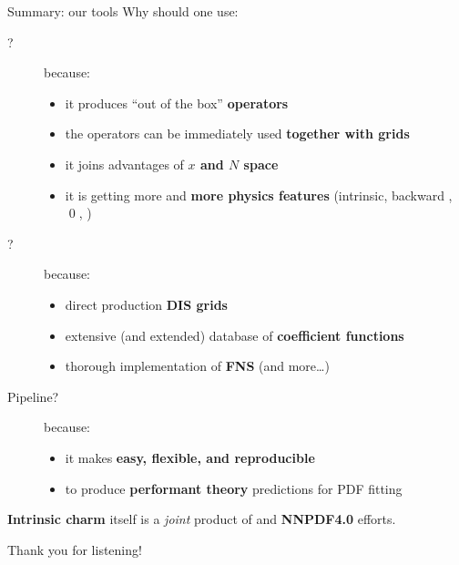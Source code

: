 \documentclass[9pt]{beamer}
\begin{document}
\begin{frame}{Summary: our tools}
    Why should one use:
    \begin{description}
        \item[\eko?] because:
            \begin{itemize}
                \item it produces \enquote{out of the box} \textbf{operators}
                \item the operators can be immediately used \textbf{together with grids}
                \item it joins advantages of \textbf{$x$ and $N$ space}
                \item it is getting more and \textbf{more physics
                    features} (intrinsic, backward \vfns, \qed, \nnnlo)
            \end{itemize}
        \item[\yadism?] because:
            \begin{itemize}
                \item direct production \textbf{DIS grids}
                \item extensive (and extended) database of \textbf{coefficient
                    functions}
                \item thorough implementation of \textbf{FNS} (and more\dots)
            \end{itemize}
        \item[Pipeline?] because:
            \begin{itemize}
                \item it makes \textbf{easy, flexible, and reproducible}
                \item to produce \textbf{performant theory} predictions for PDF fitting
            \end{itemize}
                 \end{description}

    \vspace*{15pt}
    \alert{\textbf{Intrinsic charm}} itself is a \textit{joint} product of \eko
    and \textbf{NNPDF4.0} efforts.
\end{frame}

\begin{frame}[standout]
    Thank you for listening!
\end{frame}

\appendix

\section{\eko}
\end{document}
